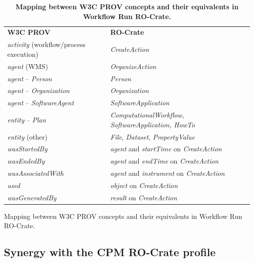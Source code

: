 \documentclass[10pt,letterpaper]{article}
\newlength\savedwidth
\newcommand\thickhline{\noalign{\global\savedwidth\arrayrulewidth\global\arrayrulewidth 2pt}%
\hline
\noalign{\global\arrayrulewidth\savedwidth}}
\begin{document}
\begin{table}[!ht]
\begin{adjustwidth}{-1.5cm}{0in}
\centering
\caption{
{\bf Mapping between W3C PROV concepts and their equivalents in Workflow Run RO-Crate.}}
\begin{tabular}{l|l}
\hline
{\bf W3C PROV} & {\bf RO-Crate}\\ \thickhline

\emph{activity} (workflow/process execution) & \emph{CreateAction}\\ \hline
\emph{agent} (WMS) & \emph{OrganizeAction}\\ \hline
\emph{agent} -- \emph{Person} & \emph{Person}\\ \hline
\emph{agent} -- \emph{Organization} & \emph{Organization}\\ \hline
\emph{agent} -- \emph{SoftwareAgent} &
\emph{SoftwareApplication}\\ \hline
\emph{entity} -- \emph{Plan} & \emph{ComputationalWorkflow},
\emph{SoftwareApplication, HowTo}\\ \hline
\emph{entity} (other) & \emph{File}, \emph{Dataset},
\emph{PropertyValue}\\ \hline
\emph{wasStartedBy} & \emph{agent} and \emph{startTime} on
\emph{CreateAction}\\ \hline
\emph{wasEndedBy} & \emph{agent} and \emph{endTime} on
\emph{CreateAction}\\ \hline
\emph{wasAssociatedWith} & \emph{agent} and \emph{instrument} on
\emph{CreateAction}\\ \hline
\emph{used} & \emph{object} on \emph{CreateAction}\\ \hline
\emph{wasGeneratedBy} & \emph{result} on
\emph{CreateAction}\\ \hline

\end{tabular}
\label{rocrate_prov_mapping}
\end{adjustwidth}
\end{table}

Mapping between W3C PROV concepts and their equivalents in Workflow Run RO-Crate.

\subsection{Synergy with the CPM RO-Crate profile}\label{synergy-with-the-cpm-ro-crate-profile}
\end{document}
